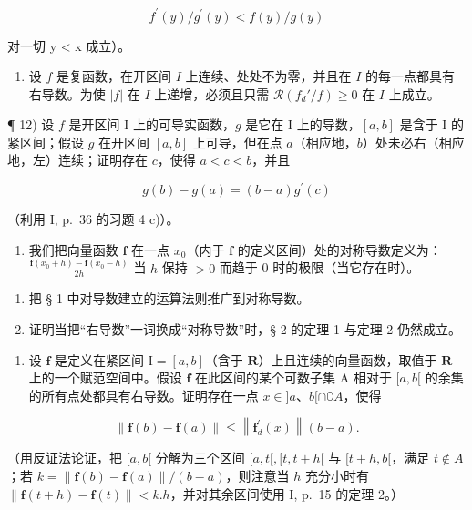 \[
f ^ {\prime} (y) / g ^ {\prime} (y) <   f (y) / g (y)
\]

对一切 y \textless{} x 成立）。

\begin{enumerate}
\def\labelenumi{\arabic{enumi})}
\setcounter{enumi}{10}
\tightlist
\item
  设 \(f\) 是复函数，在开区间 \(I\) 上连续、处处不为零，并且在 \(I\) 的每一点都具有右导数。为使 \(|f|\) 在 \(I\) 上递增，必须且只需 \(\mathcal{R}(f_d' / f) \geqslant 0\) 在 \(I\) 上成立。
\end{enumerate}

¶ 12) 设 \(f\) 是开区间 I 上的可导实函数，\(g\) 是它在 I 上的导数，\([a, b]\) 是含于 I 的紧区间；假设 \(g\) 在开区间 \([a, b]\) 上可导，但在点 \(a\)（相应地，\(b\)）处未必右（相应地，左）连续；证明存在 \(c\)，使得 \(a < c < b\)，并且

\[
g (b) - g (a) = (b - a) g ^ {\prime} (c)
\]

（利用 I, p.~36 的习题 4 c)）。

\begin{enumerate}
\def\labelenumi{\arabic{enumi})}
\setcounter{enumi}{12}
\tightlist
\item
  我们把向量函数 \(\mathbf{f}\) 在一点 \(x_0\)（内于 \(\mathbf{f}\) 的定义区间）处的对称导数定义为：\(\frac{\mathbf{f}(x_0 + h) - \mathbf{f}(x_0 - h)}{2h}\) 当 \(h\) 保持 \(>0\) 而趋于 0 时的极限（当它存在时）。
\end{enumerate}

\begin{enumerate}
\def\labelenumi{\alph{enumi})}
\item
  把 § 1 中对导数建立的运算法则推广到对称导数。
\item
  证明当把“右导数”一词换成“对称导数”时，§ 2 的定理 1 与定理 2 仍然成立。
\end{enumerate}

\begin{enumerate}
\def\labelenumi{\arabic{enumi})}
\setcounter{enumi}{13}
\tightlist
\item
  设 \(\mathbf{f}\) 是定义在紧区间 \(\mathrm{I} = [a, b]\)（含于 \(\mathbf{R}\)）上且连续的向量函数，取值于 \(\mathbf{R}\) 上的一个赋范空间中。假设 \(\mathbf{f}\) 在此区间的某个可数子集 A 相对于 \([a, b[\) 的余集的所有点处都具有右导数。证明存在一点 \(x \in ]a\)、\(b[\cap ∁A\)，使得
\end{enumerate}

\[
\left\| \mathbf {f} (b) - \mathbf {f} (a) \right\| \leqslant \left\| \mathbf {f} _ {d} ^ {\prime} (x) \right\| (b - a).
\]

（用反证法论证，把 \([a, b[\) 分解为三个区间 \([a, t[, [t, t + h[\) 与 \([t + h, b[\)，满足 \(t \notin A\)；若 \(k = \| \mathbf{f}(b) - \mathbf{f}(a)\| / (b - a)\)，则注意当 \(h\) 充分小时有 \(\| \mathbf{f}(t + h) - \mathbf{f}(t)\| < k.h\)，并对其余区间使用 I, p.~15 的定理 2。）

\setcounter{exercisegroup}{2}
